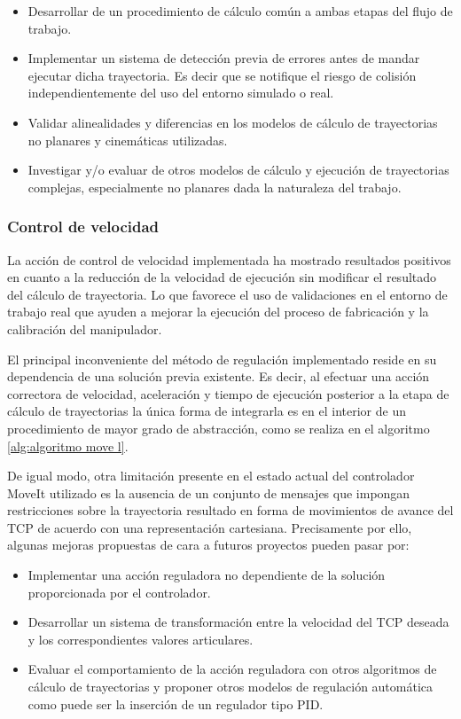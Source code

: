 \begin{itemize}
    \item Desarrollar de un procedimiento de cálculo común a ambas etapas del flujo de trabajo.
    \item Implementar un sistema de detección previa de errores antes de mandar ejecutar dicha trayectoria. Es decir que se notifique el riesgo de colisión independientemente del uso del entorno simulado o real.
    \item Validar alinealidades y diferencias en los modelos de cálculo de trayectorias no planares y cinemáticas utilizadas.
    \item Investigar y/o evaluar de otros modelos de cálculo y ejecución de trayectorias complejas, especialmente no planares dada la naturaleza del trabajo.
\end{itemize}


\subsubsection*{Control de velocidad}
\hypertarget{Control de velocidad conclusiones}{}
\label{sec: control velocidad conclusiones}

La acción de control de velocidad implementada ha mostrado resultados positivos en cuanto a la reducción de la velocidad de ejecución sin modificar el resultado del cálculo de trayectoria. Lo que favorece el uso de validaciones en el entorno de trabajo real que ayuden a mejorar la ejecución del proceso de fabricación y la calibración del manipulador.

El principal inconveniente del método de regulación implementado reside en su dependencia de una solución previa existente. Es decir, al efectuar una acción correctora de velocidad, aceleración y tiempo de ejecución posterior a la etapa de cálculo de trayectorias la única forma de integrarla es en el interior de un procedimiento de mayor grado de abstracción, como se realiza en el algoritmo \ref{alg:algoritmo move l}.

De igual modo, otra limitación presente en el estado actual del controlador MoveIt utilizado es la ausencia de un conjunto de mensajes que impongan restricciones sobre la trayectoria resultado en forma de movimientos de avance del \acrshort{TCP} de acuerdo con una representación cartesiana. Precisamente por ello, algunas mejoras propuestas de cara a futuros proyectos pueden pasar por:
\begin{itemize}
    \item Implementar una acción reguladora no dependiente de la solución proporcionada por el controlador.
    \item Desarrollar un sistema de transformación entre la velocidad del \acrshort{TCP} deseada y los correspondientes valores articulares.
    \item Evaluar el comportamiento de la acción reguladora con otros algoritmos de cálculo de trayectorias y proponer otros modelos de regulación automática como puede ser la inserción de un regulador tipo PID.
\end{itemize}


